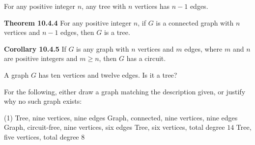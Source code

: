 \documentclass[../mathNotesPreamble]{subfiles}
\begin{document}
  \begin{thmBox*}[Theorem 10.4.2]
    For any positive integer $n$, any tree with $n$ vertices has $n-1$ edges.
    \vspace*{\baselineskip}

    \noindent \textbf{Theorem 10.4.4} \newline
    For any positive integer $n$, if $G$ is a connected graph with $n$ vertices and $n-1$ edges, then $G$ is a tree.
    \vspace*{\baselineskip}

    \noindent \textbf{Corollary 10.4.5} \newline
    If $G$ is any graph with $n$ vertices and $m$ edges, where $m$ and $n$ are positive integers and $m\geq n$, then $G$ has a circuit.
  \end{thmBox*}

  \begin{ex*}
    A graph $G$ has ten vertices and twelve edges. Is it a tree?
  \end{ex*}
  \pagebreak

  \begin{ex*}
    For the following, either draw a graph matching the description given, or justify why no such graph exists:
    \begin{extasks}[after-item-skip=\stretch{1}](1)
      \task Tree, nine vertices, nine edges
      \task Graph, connected, nine vertices, nine edges
      \task Graph, circuit-free, nine vertices, six edges
      \task Tree, six vertices, total degree $14$
      \task Tree, five vertices, total degree $8$
    \end{extasks}
  \end{ex*}

  \pagebreak
\end{document}
